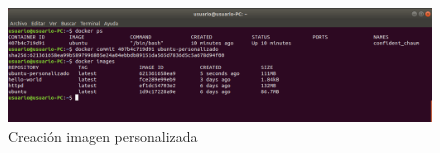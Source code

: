 \begin{figure}[!hbtp]
	\centering
	\includegraphics[width=\linewidth]{Trabajo/RecursosEducativos/RE05_Docker/Gestion_basica/REDocker_Gestion11.png}
	\vspace{-0.2cm}
	\caption{Creación imagen personalizada}
	\label{fig:DockerGestion11}
\end{figure}

